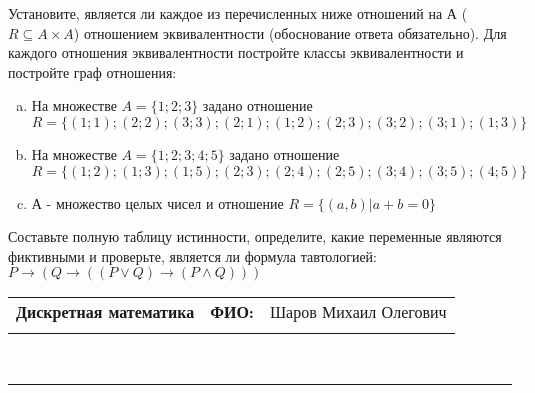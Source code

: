 \documentclass[10pt]{exam}
\newcommand{\class}{Дискретная математика}
\newcommand{\examdate}{}
\begin{document}
\begin{questions}
\question
Установите, является ли каждое из перечисленных ниже отношений на А ($R \subseteq A \times A$) отношением эквивалентности (обоснование ответа обязательно). Для каждого отношения эквивалентности постройте классы 
эквивалентности и постройте граф отношения:
\begin{enumerate} [a)]\setcounter{enumi}{0}
\item На множестве $A = \{1; 2; 3\}$ задано отношение $R = \{(1; 1); (2; 2); (3; 3); (2; 1); (1; 2); (2; 3); (3; 2); (3; 1); (1; 3)\}$
\item На множестве $A = \{1; 2; 3; 4; 5\}$ задано отношение $R = \{(1; 2); (1; 3); (1; 5); (2; 3); (2; 4); (2; 5); (3; 4); (3; 5); (4; 5)\}$
\item А - множество целых чисел и отношение $R = \{(a,b)|a + b = 0\}$
\end{enumerate}\question Составьте полную таблицу истинности, определите, какие переменные являются фиктивными и проверьте, является ли формула тавтологией:
$ P \rightarrow (Q \rightarrow ((P \lor Q) \rightarrow (P \land Q)))$

\end{questions}
\newpage
\begin{flushright}
\begin{tabular}{p{2.8in} r l}
\textbf{\class} & \textbf{ФИО:} &Шаров Михаил Олегович
\\

\textbf{\examdate} &&\\
\end{tabular}\\
\end{flushright}
\rule[1ex]{\textwidth}{.1pt}
\end{document}
